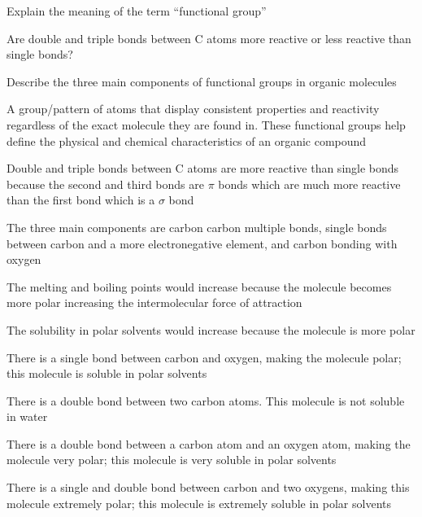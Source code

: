 \begin{problems}
    \item Explain the meaning of the term ``functional group''
    \item Are double and triple bonds between C atoms more reactive or less reactive than single 
        bonds?
    \item Describe the three main components of functional groups in organic molecules
\end{problems}
\begin{solutions}
    \item A group/pattern of atoms that display consistent properties and reactivity regardless of
        the exact molecule they are found in. These functional groups help define the physical and
        chemical characteristics of an organic compound
    \item Double and triple bonds between C atoms are more reactive than single bonds because the
        second and third bonds are $\pi$ bonds which are much more reactive than the first bond
        which is a $\sigma$ bond
    \item The three main components are carbon carbon multiple bonds, single bonds between carbon
        and a more electronegative element, and carbon bonding with oxygen
    \item 
        \begin{enum-alph}
            \item The melting and boiling points would increase because the molecule becomes more
                polar increasing the intermolecular force of attraction
            \item The solubility in polar solvents would increase because the molecule is more
                polar
        \end{enum-alph}
    \item 
        \begin{enum-alph}
            \item There is a single bond between carbon and oxygen, making the molecule polar; 
                this molecule is soluble in polar solvents
            \item There is a double bond between two carbon atoms. This molecule is not
                soluble in water
            \item There is a double bond between a carbon atom and an oxygen atom, making the
                molecule very polar; this molecule is very soluble in polar solvents
            \item There is a single and double bond between carbon and two oxygens, making this
                molecule extremely polar; this molecule is extremely soluble in polar solvents
        \end{enum-alph}
\end{solutions}

